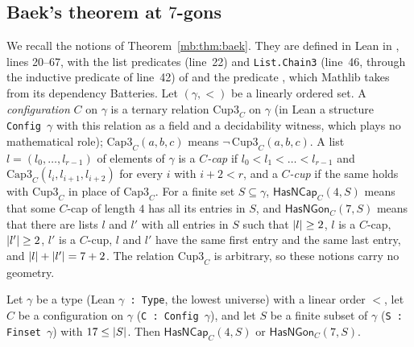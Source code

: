 \subsection{Baek's theorem at \texorpdfstring{$7$}{7}-gons}\label{sa:ssec:baek}

We recall the notions of Theorem~\ref{mb:thm:baek}. They are defined in Lean in
, lines 20--67, with the list predicates  (line~22) and
\texttt{List.Chain3\textquotesingle} (line~46, through the inductive predicate  of line~42) of
 and the predicate , which Mathlib takes from
its dependency Batteries. Let $(\gamma,<)$ be a linearly ordered set. A
\emph{configuration} $C$ on $\gamma$ is a ternary relation $\mathrm{Cup3}_C$ on $\gamma$ (in Lean a structure
\texttt{Config}~$\gamma$ with this relation as a field and a decidability witness, which plays no mathematical role);
$\mathrm{Cap3}_C(a,b,c)$ means $\neg\,\mathrm{Cup3}_C(a,b,c)$. A list $l=(l_0,\dots,l_{r-1})$ of elements of $\gamma$
is a \emph{$C$-cap} if $l_0<l_1<\dots<l_{r-1}$ and $\mathrm{Cap3}_C(l_i,l_{i+1},l_{i+2})$ for every $i$ with $i+2<r$,
and a \emph{$C$-cup} if the same holds with $\mathrm{Cup3}_C$ in place of $\mathrm{Cap3}_C$. For a finite set
$S\subseteq\gamma$, $\mathsf{HasNCap}_C(4,S)$ means that some $C$-cap of length $4$ has all its entries in $S$, and
$\mathsf{HasNGon}_C(7,S)$ means that there are lists $l$ and $l'$ with all entries in $S$ such that $\lvert l\rvert\ge2$, $l$
is a $C$-cap, $\lvert l'\rvert\ge2$, $l'$ is a $C$-cup, $l$ and $l'$ have the same first entry and the same last entry, and
$\lvert l\rvert+\lvert l'\rvert=7+2$. The relation $\mathrm{Cup3}_C$ is arbitrary, so these notions carry no geometry.

\begin{theorem}\label{sa:thm:baek-seven}
Let $\gamma$ be a type \textup{(}Lean \mbox{\texttt{$\gamma$ : Type}}, the lowest universe\textup{)} with a linear
order $<$, let $C$ be a configuration on $\gamma$ \textup{(}\mbox{\texttt{C : Config}~$\gamma$}\textup{)}, and let
$S$ be
a finite subset of $\gamma$ \textup{(}\mbox{\texttt{S : Finset}~$\gamma$}\textup{)} with $17\le\lvert S\rvert$. Then
$\mathsf{HasNCap}_C(4,S)$ or $\mathsf{HasNGon}_C(7,S)$.
\end{theorem}

